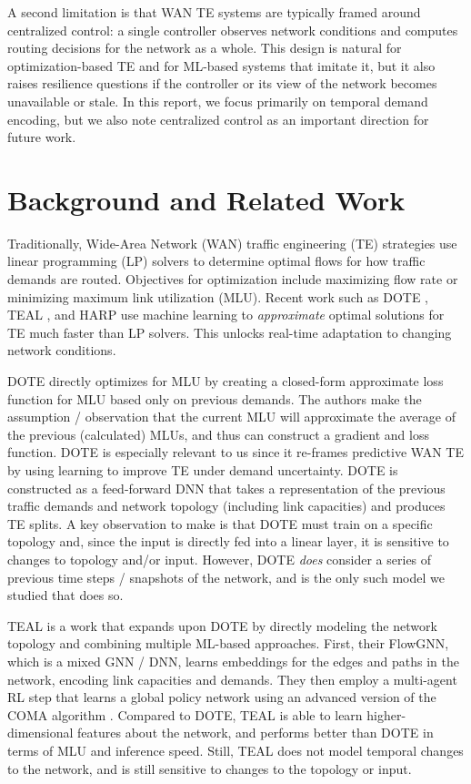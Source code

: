 \documentclass[letterpaper,twocolumn,10pt]{article}
\begin{document}
A second limitation is that WAN TE systems are typically framed around centralized control: a single controller observes network conditions and computes routing decisions for the network as a whole. This design is natural for optimization-based TE and for ML-based systems that imitate it, but it also raises resilience questions if the controller or its view of the network becomes unavailable or stale. In this report, we focus primarily on temporal demand encoding, but we also note centralized control as an important direction for future work.

\section{Background and Related Work}

Traditionally, Wide-Area Network (WAN) traffic engineering (TE) strategies use linear programming (LP) solvers to determine optimal flows for how traffic demands are routed. Objectives for optimization include maximizing flow rate or minimizing maximum link utilization (MLU). Recent work such as DOTE \cite{perry2023dote}, TEAL \cite{Teal}, and HARP \cite{Harp} use machine learning to \emph{approximate} optimal solutions for TE much faster than LP solvers. This unlocks real-time adaptation to changing network conditions.

DOTE directly optimizes for MLU by creating a closed-form approximate loss function for MLU based only on previous demands. The authors make the assumption / observation that the current MLU will approximate the average of the previous (calculated) MLUs, and thus can construct a gradient and loss function. DOTE is especially relevant to us since it re-frames predictive WAN TE by using learning to improve TE under demand uncertainty. DOTE is constructed as a feed-forward DNN that takes a representation of the previous traffic demands and network topology (including link capacities) and produces TE splits. A key observation to make is that DOTE must train on a specific topology and, since the input is directly fed into a linear layer, it is sensitive to changes to topology and/or input. However, DOTE \textit{does} consider a series of previous time steps / snapshots of the network, and is the only such model we studied that does so. 

TEAL is a work that expands upon DOTE by directly modeling the network topology and combining multiple ML-based approaches. First, their FlowGNN, which is a mixed GNN / DNN, learns embeddings for the edges and paths in the network, encoding link capacities and demands. They then employ a multi-agent RL step that learns a global policy network using an advanced version of the COMA algorithm \cite{foerster2018counterfactual}. Compared to DOTE, TEAL is able to learn higher-dimensional features about the network, and performs better than DOTE in terms of MLU and inference speed. Still, TEAL does not model temporal changes to the network, and is still sensitive to changes to the topology or input.
\end{document}
